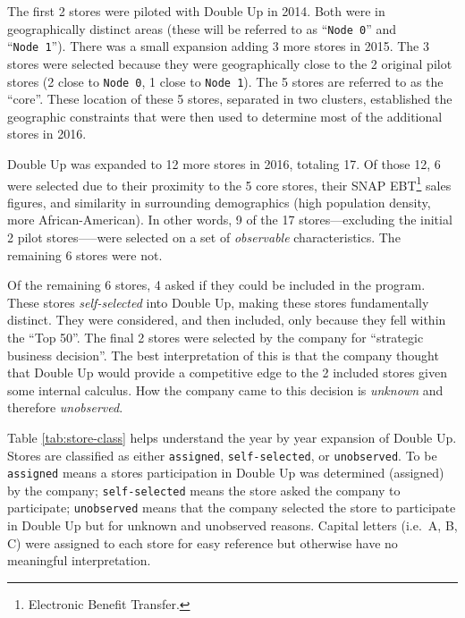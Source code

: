 \documentclass[12pt,letterpaperpaper,]{book}
\begin{document}
The first 2 stores were piloted with Double Up in 2014. Both were in
geographically distinct areas (these will be referred to as
``\texttt{Node\ 0}'' and ``\texttt{Node\ 1}''). There was a small
expansion adding 3 more stores in 2015. The 3 stores were selected
because they were geographically close to the 2 original pilot stores (2
close to \texttt{Node\ 0}, 1 close to \texttt{Node\ 1}). The 5 stores
are referred to as the ``core''. These location of these 5 stores,
separated in two clusters, established the geographic constraints that
were then used to determine most of the additional stores in 2016.

Double Up was expanded to 12 more stores in 2016, totaling 17. Of those
12, 6 were selected due to their proximity to the 5 core stores, their
SNAP EBT\footnote{Electronic Benefit Transfer.} sales figures, and
similarity in surrounding demographics (high population density, more
African-American). In other words, 9 of the 17 stores---excluding the
initial 2 pilot stores-----were selected on a set of \emph{observable}
characteristics. The remaining 6 stores were not.

Of the remaining 6 stores, 4 asked if they could be included in the
program. These stores \emph{self-selected} into Double Up, making these
stores fundamentally distinct. They were considered, and then included,
only because they fell within the ``Top 50''. The final 2 stores were
selected by the company for ``strategic business decision''. The best
interpretation of this is that the company thought that Double Up would
provide a competitive edge to the 2 included stores given some internal
calculus. How the company came to this decision is \emph{unknown} and
therefore \emph{unobserved}.

Table \ref{tab:store-class} helps understand the year by year expansion
of Double Up. Stores are classified as either \texttt{assigned},
\texttt{self-selected}, or \texttt{unobserved}. To be \texttt{assigned}
means a stores participation in Double Up was determined (assigned) by
the company; \texttt{self-selected} means the store asked the company to
participate; \texttt{unobserved} means that the company selected the
store to participate in Double Up but for unknown and unobserved
reasons. Capital letters (i.e.~A, B, C) were assigned to each store for
easy reference but otherwise have no meaningful interpretation.
\end{document}
